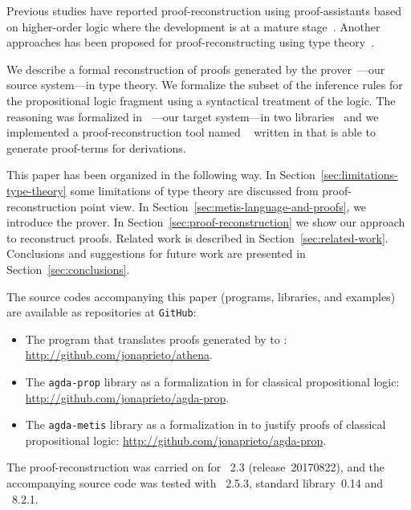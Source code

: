 \documentclass[../main.tex]{subfiles}
\begin{document}
Previous studies have reported proof-reconstruction using
proof-assistants based on higher-order logic where the development is
at a mature
stage~\cite{paulson2010three,hurlin07practical,kaliszyk2013}. Another
approaches has been proposed for proof-reconstructing using type
theory~\cite{Bezem2002,armand2011,Ekici2017,kanso2016light}.

We describe a formal reconstruction of proofs generated by the \Metis
prover~\cite{hurd2003first}---our source system---in type theory. We
formalize the subset of the \Metis inference rules for the
propositional logic fragment using a syntactical treatment of the
logic. The \Metis reasoning was formalized in
\Agda~\cite{agdateam}---our target system---in two
libraries~\cite{AgdaProp,AgdaMetis} and we implemented a
proof-reconstruction tool named \Athena~\cite{Athena} written in
\Haskell that is able to generate \Agda proof-terms for \Metis
derivations.

This paper has been organized in the following way.
In Section~\ref{sec:limitations-type-theory} some limitations of type theory
are discussed from proof-reconstruction point view.
In Section~\ref{sec:metis-language-and-proofs}, we introduce the
\Metis prover.
In Section~\ref{sec:proof-reconstruction} we show our
approach to reconstruct \Metis proofs.
Related work is described in Section~\ref{sec:related-work}.
Conclusions and suggestions for future work are  presented in
Section~\ref{sec:conclusions}.


The source codes accompanying this paper (programs, libraries, and
examples) are available as repositories at \verb!GitHub!:

\begin{itemize}
  \item The \Athena program that translates proofs generated by \Metis to \Agda:
  \url{http://github.com/jonaprieto/athena}.
  \item The \verb!agda-prop! library as a formalization in \Agda for
    classical propositional logic:
  \url{http://github.com/jonaprieto/agda-prop}.
\item The \verb!agda-metis! library as a formalization in \Agda to
  justify \Metis proofs of classical propositional logic:
  \url{http://github.com/jonaprieto/agda-prop}.
\end{itemize}

The proof-reconstruction was carried on for \Metis~2.3
(release~20170822), and the accompanying source code was tested with
\Agda~2.5.3, \Agda standard library~0.14 and ~8.2.1.
\end{document}
